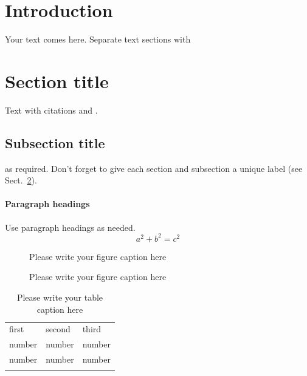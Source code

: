 %
%



\section{Introduction}
\label{intro}
Your text comes here. Separate text sections with
\section{Section title}
\label{sec:1}
Text with citations \citep{RefB} and \citep{RefJ}.
\subsection{Subsection title}
\label{sec:2}
as required. Don't forget to give each section
and subsection a unique label (see Sect.~\ref{sec:1}).
\paragraph{Paragraph headings} Use paragraph headings as needed.
\begin{equation}
a^2+b^2=c^2
\end{equation}

\begin{figure}
\caption{Please write your figure caption here}
\label{fig:1}       %
\end{figure}
%
\begin{figure}
\caption{Please write your figure caption here}
\label{fig:2}       %
\end{figure}
%
\begin{table}
\caption{Please write your table caption here}
\label{tab:1}       %
\begin{tabular}{lll}
\hline\noalign{\smallskip}
first & second & third  \\
\noalign{\smallskip}\hline\noalign{\smallskip}
number & number & number \\
number & number & number \\
\noalign{\smallskip}\hline
\end{tabular}
\end{table}


